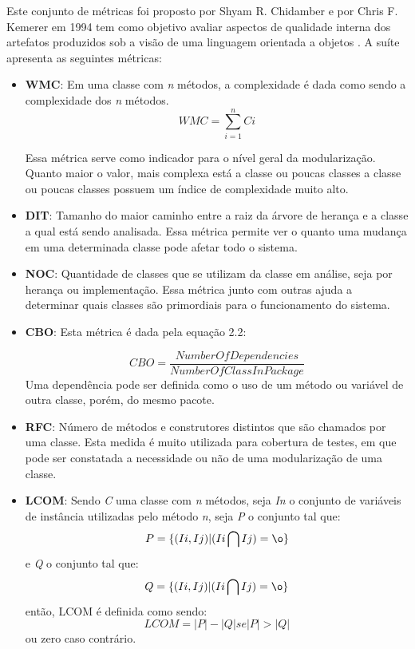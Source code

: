 Este conjunto de métricas foi proposto por Shyam R. Chidamber e por Chris F. Kemerer em 1994 tem como objetivo avaliar aspectos de qualidade interna dos artefatos produzidos sob a visão de uma linguagem orientada a objetos \cite{chidamber}. A suíte apresenta as seguintes métricas:
\begin{itemize}

\item \textbf{WMC}: Em uma classe com \textit{n} métodos, a complexidade é dada como sendo a complexidade dos \textit{n} métodos. 
 \begin{equation}
WMC = \sum_{i=1}^{n}Ci
\end{equation}


Essa métrica serve como indicador para o nível geral da modularização. Quanto maior o valor, mais complexa está a classe ou poucas classes a classe ou poucas classes possuem um índice de complexidade muito alto.

\item \textbf{DIT}: Tamanho do maior caminho entre a raiz da árvore de herança e a classe a qual está sendo analisada. Essa métrica permite ver o quanto uma mudança em uma determinada classe pode afetar todo o sistema.

\item \textbf{NOC}: Quantidade de classes que se utilizam da classe em análise, seja por herança ou implementação. Essa métrica junto com outras ajuda a determinar quais classes são primordiais para o funcionamento do sistema.

\item \textbf{CBO}: Esta métrica é dada pela equação 2.2: 

\begin{equation}
CBO = \frac{NumberOfDependencies}{NumberOfClassInPackage}
\end{equation}
Uma dependência pode ser definida como o uso de um método ou variável de outra classe, porém, do mesmo pacote.

\item \textbf{RFC}: Número de métodos e construtores distintos que são chamados por uma classe. Esta medida é muito utilizada para cobertura de testes, em que pode ser constatada a necessidade ou não de uma modularização de uma classe.

\item \textbf{LCOM}: Sendo \textit{C} uma classe com \textit{n} métodos, seja \textit{In} o conjunto de variáveis de instância utilizadas pelo método \textit{n}, seja \textit{P} o conjunto tal que:
\begin{equation}
P = \{(Ii,Ij)|(Ii\bigcap Ij)= \o\}
\end{equation}
e \textit{Q} o conjunto tal que:
\begin{equation}
Q = \{(Ii,Ij)|(Ii\bigcap Ij)= \o\}
\end{equation}
então, LCOM é definida como sendo:
\begin{equation}
LCOM = |P| - |Q| se |P|>|Q|
\end{equation}
ou zero caso contrário.
\end{itemize}


